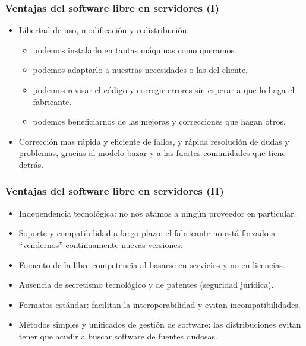 \documentclass{beamer}
\begin{document}

\begin{frame}
\frametitle{Ventajas del software libre en servidores (I)}

\begin{itemize}
\item Libertad de uso, modificación y redistribución: 
	\begin{itemize}
	\item podemos \alert{instalarlo} en tantas máquinas como queramos.
	\item podemos \alert{adaptarlo} a nuestras necesidades o las del cliente.
	\item podemos revisar el código y \alert{corregir} errores sin esperar a que lo haga el fabricante.
	\item podemos beneficiarnos de las mejoras y correcciones que hagan otros.
	\end{itemize}

\item  Corrección mas rápida y eficiente de fallos, y rápida resolución de dudas y problemas, gracias al \alert{modelo bazar} y a las fuertes comunidades que tiene detrás.

\end{itemize}
\end{frame}


\begin{frame}
\frametitle{Ventajas del software libre en servidores (II)}

\begin{itemize}
\item \alert{Independencia tecnológica}: no nos atamos a ningún proveedor en particular.
\item Soporte y \alert{compatibilidad} a largo plazo: el fabricante no está forzado a ``vendernos'' continuamente nuevas versiones. 
\item Fomento de la \alert{libre competencia} al basarse en servicios y no en licencias.
\item Ausencia de secretismo tecnológico y de patentes (seguridad jurídica). 
\item \alert{Formatos estándar}: facilitan la interoperabilidad y evitan incompatibilidades. 
\item Métodos simples y unificados de gestión de software: las distribuciones evitan tener que acudir a buscar software de fuentes dudosas.
\end{itemize}
\end{frame}
\end{document}
